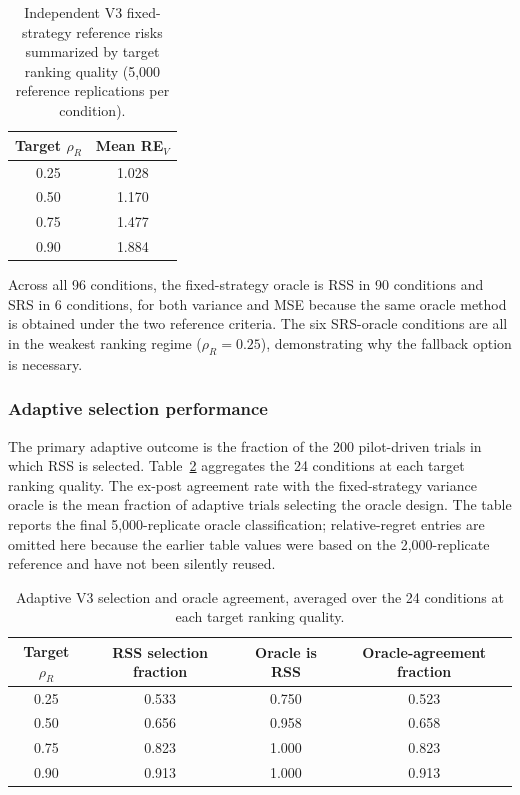 \documentclass[12pt]{article}
\begin{document}
\begin{table}[htbp]
\centering
\caption{Independent V3 fixed-strategy reference risks summarized by target ranking quality (5,000 reference replications per condition).}
\label{tab:v3_reference_summary}
\begin{tabular}{cc}
\toprule
Target $\rho_R$ & Mean RE$_V$ \\
\midrule
0.25 & 1.028 \\
0.50 & 1.170 \\
0.75 & 1.477 \\
0.90 & 1.884 \\
\bottomrule
\end{tabular}
\end{table}

Across all 96 conditions, the fixed-strategy oracle is RSS in 90 conditions and SRS in 6 conditions, for both variance and MSE because the same oracle method is obtained under the two reference criteria. The six SRS-oracle conditions are all in the weakest ranking regime ($\rho_R=0.25$), demonstrating why the fallback option is necessary.

\subsubsection{Adaptive selection performance}
The primary adaptive outcome is the fraction of the 200 pilot-driven trials in which RSS is selected. Table~\ref{tab:v3_adaptive_by_rho} aggregates the 24 conditions at each target ranking quality. The ex-post agreement rate with the fixed-strategy variance oracle is the mean fraction of adaptive trials selecting the oracle design. The table reports the final 5,000-replicate oracle classification; relative-regret entries are omitted here because the earlier table values were based on the 2,000-replicate reference and have not been silently reused.

\begin{table}[htbp]
\centering
\caption{Adaptive V3 selection and oracle agreement, averaged over the 24 conditions at each target ranking quality.}
\label{tab:v3_adaptive_by_rho}
\begin{tabular}{cccc}
\toprule
Target $\rho_R$ & RSS selection fraction & Oracle is RSS & Oracle-agreement fraction \\
\midrule
0.25 & 0.533 & 0.750 & 0.523 \\
0.50 & 0.656 & 0.958 & 0.658 \\
0.75 & 0.823 & 1.000 & 0.823 \\
0.90 & 0.913 & 1.000 & 0.913 \\
\bottomrule
\end{tabular}
\end{table}
\end{document}
